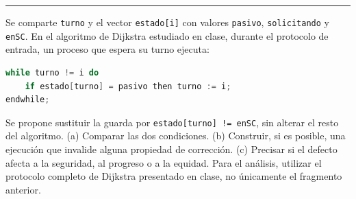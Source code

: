 \documentclass[11pt,a4paper,twoside,openright]{report}
\begin{document}
\vspace{15pt}
\hrule
\vspace{15pt}

\begin{ejercicio}
Se comparte \texttt{turno} y el vector \texttt{estado[i]} con valores \texttt{pasivo}, \texttt{solicitando} y \texttt{enSC}. En el algoritmo de Dijkstra estudiado en clase, durante el protocolo de entrada, un proceso que espera su turno ejecuta:
\begin{lstlisting}[language=C++]
while turno != i do
    if estado[turno] = pasivo then turno := i;
endwhile;
\end{lstlisting}
Se propone sustituir la guarda por \texttt{estado[turno] != enSC}, sin alterar el resto del algoritmo. (a) Comparar las dos condiciones. (b) Construir, si es posible, una ejecución que invalide alguna propiedad de corrección. (c) Precisar si el defecto afecta a la seguridad, al progreso o a la equidad. Para el análisis, utilizar el protocolo completo de Dijkstra presentado en clase, no únicamente el fragmento anterior.
\end{ejercicio}
\end{document}
